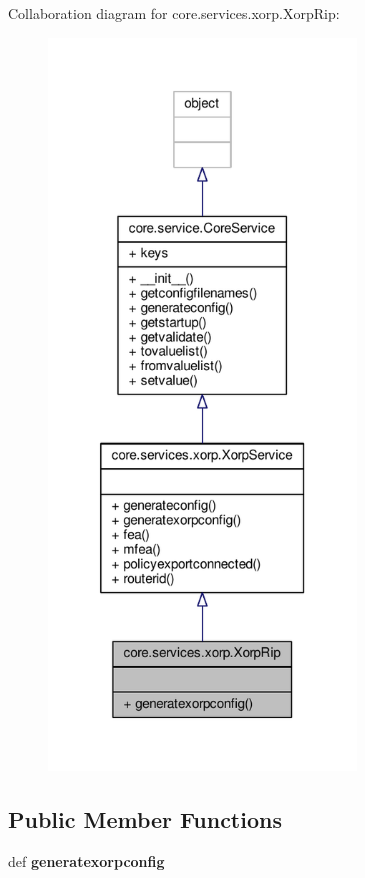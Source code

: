 Collaboration diagram for core.\+services.\+xorp.\+Xorp\+Rip\+:
\nopagebreak
\begin{figure}[H]
\begin{center}
\leavevmode
\includegraphics[height=550pt]{classcore_1_1services_1_1xorp_1_1_xorp_rip__coll__graph}
\end{center}
\end{figure}
\subsection*{Public Member Functions}
\begin{DoxyCompactItemize}
\item 
\hypertarget{classcore_1_1services_1_1xorp_1_1_xorp_rip_a2c8a36298ab74334b85f6ce01fd78c2a}{def {\bfseries generatexorpconfig}}\label{classcore_1_1services_1_1xorp_1_1_xorp_rip_a2c8a36298ab74334b85f6ce01fd78c2a}

\end{DoxyCompactItemize}
